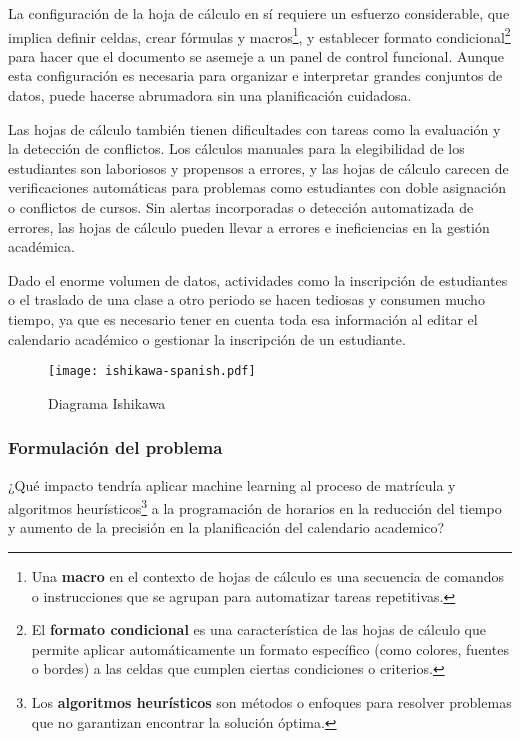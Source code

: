 La configuración de la hoja de cálculo en sí requiere un esfuerzo considerable, que implica definir celdas, crear fórmulas y macros\footnote{Una \textbf{macro} en el contexto de hojas de cálculo es una secuencia de comandos o instrucciones que se agrupan para automatizar tareas repetitivas.}, y establecer formato condicional\footnote{El \textbf{formato condicional} es una característica de las hojas de cálculo que permite aplicar automáticamente un formato específico (como colores, fuentes o bordes) a las celdas que cumplen ciertas condiciones o criterios.} para hacer que el documento se asemeje a un panel de control funcional.
Aunque esta configuración es necesaria para organizar e interpretar grandes conjuntos de datos, puede hacerse abrumadora sin una planificación cuidadosa.

Las hojas de cálculo también tienen dificultades con tareas como la evaluación y la detección de conflictos.
Los cálculos manuales para la elegibilidad de los estudiantes son laboriosos y propensos a errores, y las hojas de cálculo carecen de verificaciones automáticas para problemas como estudiantes con doble asignación o conflictos de cursos.
Sin alertas incorporadas o detección automatizada de errores, las hojas de cálculo pueden llevar a errores e ineficiencias en la gestión académica.

Dado el enorme volumen de datos, actividades como la inscripción de estudiantes o el traslado de una clase a otro periodo se hacen tediosas y consumen mucho tiempo, ya que es necesario tener en cuenta toda esa información al editar el calendario académico o gestionar la inscripción de un estudiante.

\begin{figure}[H]
    \centering
    \caption{Diagrama Ishikawa} \label{fig:ishikawa}
    \texttt{[image: ishikawa-spanish.pdf]}
\end{figure}

\subsubsection{Formulación del problema}
¿Qué impacto tendría aplicar machine learning al proceso de matrícula y algoritmos heurísticos\footnote{Los \textbf{algoritmos heurísticos} son métodos o enfoques para resolver problemas que no garantizan encontrar la solución óptima.} a la programación de horarios en la reducción del tiempo y aumento de la precisión en la planificación del calendario academico?
